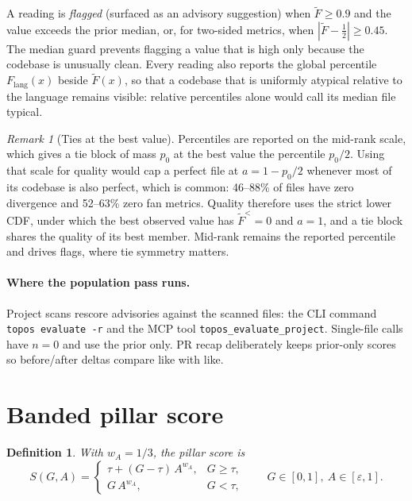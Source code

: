 \documentclass[11pt]{article}
\newtheorem{definition}{Definition}
\theoremstyle{remark}
\newtheorem{remark}{Remark}
\newcommand{\Flang}{F_{\mathrm{lang}}}
\newcommand{\Ft}{\tilde F}
\newcommand{\wA}{w_A}
\begin{document}
A reading is \emph{flagged} (surfaced as an advisory suggestion) when
$\Ft \ge 0.9$ and the value exceeds the prior median, or, for two-sided metrics,
when $|\Ft - \tfrac12| \ge 0.45$. The median guard prevents flagging a value
that is high only because the codebase is unusually clean. Every reading also
reports the global percentile $\Flang(x)$ beside $\Ft(x)$, so that a codebase
that is uniformly atypical relative to the language remains visible: relative
percentiles alone would call its median file typical.

\begin{remark}[Ties at the best value]
Percentiles are reported on the mid-rank scale, which gives a tie block of mass
$p_0$ at the best value the percentile $p_0/2$. Using that scale for quality
would cap a perfect file at $a = 1 - p_0/2$ whenever most of its codebase is
also perfect, which is common: 46--88\% of files have zero divergence and
52--63\% zero fan metrics. Quality therefore uses the strict lower CDF, under
which the best observed value has $\Ft^{<} = 0$ and $a = 1$, and a tie block
shares the quality of its best member. Mid-rank remains the reported percentile
and drives flags, where tie symmetry matters.
\end{remark}

\paragraph{Where the population pass runs.} Project scans rescore
advisories against the scanned files: the CLI command \texttt{topos evaluate -r}
and the MCP tool \texttt{topos\_evaluate\_project}. Single-file calls have $n = 0$ and use the
prior only. PR recap deliberately keeps prior-only scores so before/after
deltas compare like with like.

\section{Banded pillar score}

\begin{definition}
With $\wA = 1/3$, the pillar score is
\[
S(G, A) =
\begin{cases}
\tau + (G - \tau)\,A^{\wA}, & G \ge \tau,\\
G\,A^{\wA}, & G < \tau,
\end{cases}
\qquad G \in [0,1],\ A \in [\varepsilon, 1].
\]
\end{definition}
\end{document}
